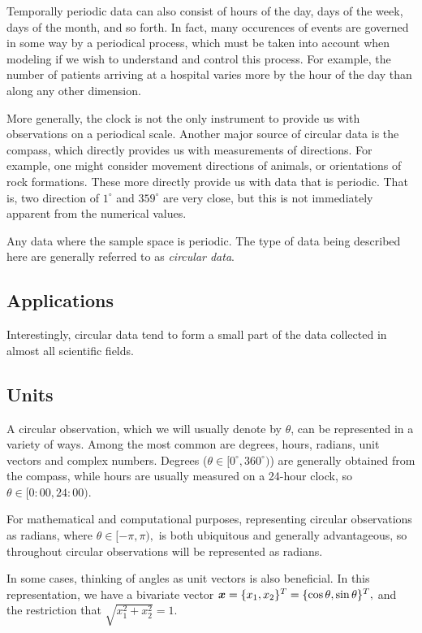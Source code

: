 \documentclass[12pt, a4paper]{book}\usepackage[]{graphicx}\usepackage[]{color}
\begin{document}
Temporally periodic data can also consist of hours of the day, days of the week, days of the month, and so forth. In fact, many occurences of events are governed in some way by a periodical process, which must be taken into account when modeling if we wish to understand and control this process. For example, the number of patients arriving at a hospital varies more by the hour of the day than along any other dimension.

More generally, the clock is not the only instrument to provide us with observations on a periodical scale. Another major source of circular data is the compass, which directly provides us with measurements of directions. For example, one might consider movement directions of animals, or orientations of rock formations. These more directly provide us with data that is periodic. That is, two direction of $1^\circ$ and $359^\circ$ are very close, but this is not immediately apparent from the numerical values.

Any data where the sample space is periodic. The type of data being described here are generally referred to as \textit{circular data}.

\subsection{Applications}

Interestingly, circular data tend to form a small part of the data collected in almost all scientific fields.

\subsection{Units}

A circular observation, which we will usually denote by $\theta$, can be represented in a variety of ways. Among the most common are degrees, hours, radians, unit vectors and complex numbers. Degrees ($\theta \in [0^\circ, 360^\circ)$) are generally obtained from the compass, while hours are usually measured on a 24-hour clock, so $\theta \in [0:00, 24:00)$.

For mathematical and computational purposes, representing circular observations as radians, where $\theta \in [-\pi, \pi),$ is both ubiquitous and generally advantageous, so throughout circular observations will be represented as radians.

In some cases, thinking of angles as unit vectors is also beneficial. In this representation, we have a bivariate vector $\boldsymbol{x} = \{x_1, x_2\}^T = \{\cos\theta, \sin\theta\}^T,$ and the restriction that $\sqrt{x_1^2 + x_2^2} = 1.$
\end{document}
